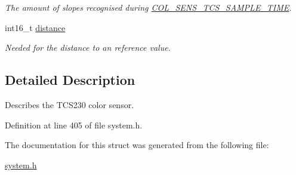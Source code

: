 \begin{CompactItemize}
\begin{CompactList}\small\item\em The amount of slopes recognised during \hyperlink{system_8h_293abcb660a47e6482b3ae3438f3e0d6}{COL\_\-SENS\_\-TCS\_\-SAMPLE\_\-TIME}. \item\end{CompactList}\item 
\hypertarget{structcolor__sensor__tcs__t_5711e6b7dd97725d47387d57767f76f3}{
int16\_\-t \hyperlink{structcolor__sensor__tcs__t_5711e6b7dd97725d47387d57767f76f3}{distance}}
\label{structcolor__sensor__tcs__t_5711e6b7dd97725d47387d57767f76f3}

\begin{CompactList}\small\item\em Needed for the distance to an reference value. \item\end{CompactList}\end{CompactItemize}


\subsection{Detailed Description}
Describes the TCS230 color sensor. 

Definition at line 405 of file system.h.

The documentation for this struct was generated from the following file:\begin{CompactItemize}
\item 
\hyperlink{system_8h}{system.h}\end{CompactItemize}
